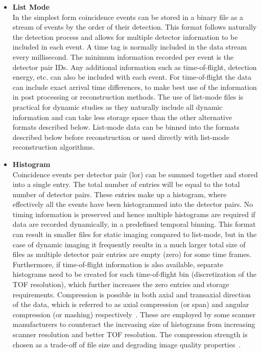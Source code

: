 \begin{itemize}

\item\textbf{List Mode}\\
In the simplest form coincidence events can be stored in a binary file as a stream of events by the order of their detection. This format follows naturally the detection process and allows for multiple detector information to be included in each event. A time tag is normally included in the data stream every millisecond. The minimum information recorded per event is the detector pair IDs. Any additional information such as time-of-flight, detection energy, etc. can also be included with each event. For time-of-flight the data can include exact arrival time differences, to make best use of the information in post processing or reconstruction methods.
The use of list-mode files is practical for dynamic studies as they naturally include all dynamic information and can take less storage space than the other alternative formats described below. List-mode data can be binned into the formats described below before reconstruction or used directly with list-mode reconstruction algorithms. 

\item\textbf{Histogram}\\
Coincidence events per detector pair (\gls{lor}) can be summed together and stored into a single entry. The total number of entries will be equal to the total number of detector pairs. These entries make up a histogram, where effectively all the events have been histogrammed into the detector pairs. No timing information is preserved and hence multiple histograms are required if data are recorded dynamically, in a predefined temporal binning. 
This format can result in smaller files for static imaging compared to list-mode, but in the case of dynamic imaging it frequently results in a much larger total size of files as multiple detector pair entries are empty (zero) for some time frames. Furthermore, if time-of-flight information is also available, separate histograms need to be created for each time-of-flight bin (discretization of the TOF resolution), which further increases the zero entries and storage requirements. 
Compression is possible in both axial and transaxial direction of the data, which is referred to as axial compression (or span) and angular compression (or mashing) respectively~\cite{Fahey2002}. These are employed by some scanner manufacturers to counteract the increasing size of histograms from increasing scanner resolution and better TOF resolution. The compression strength is chosen as a trade-off of file size and degrading image quality properties~\cite{Belzunce2017}. 


\end{itemize}
